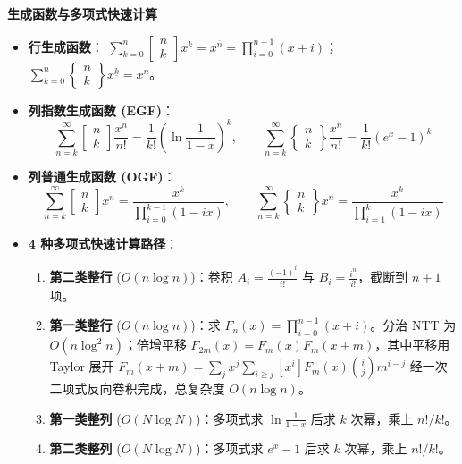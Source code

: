 \textbf{生成函数与多项式快速计算}
\begin{itemize}
    \item \textbf{行生成函数}：
    $\sum_{k=0}^n \left[ \begin{matrix} n \\ k \end{matrix} \right] x^k = x^{\overline{n}} = \prod_{i=0}^{n-1} (x+i)$；
    $\sum_{k=0}^n \left\{ \begin{matrix} n \\ k \end{matrix} \right\} x^{\underline{k}} = x^n$。
    \item \textbf{列指数生成函数 (EGF)}：
    \[
    \sum_{n=k}^\infty \left[ \begin{matrix} n \\ k \end{matrix} \right] \frac{x^n}{n!} = \frac{1}{k!} \left( \ln \frac{1}{1-x} \right)^k, \qquad
    \sum_{n=k}^\infty \left\{ \begin{matrix} n \\ k \end{matrix} \right\} \frac{x^n}{n!} = \frac{1}{k!} (e^x - 1)^k
    \]
    \item \textbf{列普通生成函数 (OGF)}：
    \[
    \sum_{n=k}^\infty \left[ \begin{matrix} n \\ k \end{matrix} \right] x^n = \frac{x^k}{\prod_{i=0}^{k-1} (1 - ix)}, \qquad
    \sum_{n=k}^\infty \left\{ \begin{matrix} n \\ k \end{matrix} \right\} x^n = \frac{x^k}{\prod_{i=1}^k (1 - ix)}
    \]
    \item \textbf{4 种多项式快速计算路径}：
    \begin{enumerate}
        \item \textbf{第二类整行} ($O(n \log n)$)：卷积 $A_i = \frac{(-1)^i}{i!}$ 与 $B_i = \frac{i^n}{i!}$，截断到 $n+1$ 项。
        \item \textbf{第一类整行} ($O(n \log n)$)：求 $F_n(x) = \prod_{i=0}^{n-1} (x+i)$。分治 NTT 为 $O(n \log^2 n)$；倍增平移 $F_{2m}(x) = F_m(x) F_m(x+m)$，其中平移用 Taylor 展开 $F_m(x+m) = \sum_{j} x^j \sum_{i \ge j} [x^i]F_m(x) \binom{i}{j} m^{i-j}$ 经一次二项式反向卷积完成，总复杂度 $O(n \log n)$。
        \item \textbf{第一类整列} ($O(N \log N)$)：多项式求 $\ln \frac{1}{1-x}$ 后求 $k$ 次幂，乘上 $n!/k!$。
        \item \textbf{第二类整列} ($O(N \log N)$)：多项式求 $e^x - 1$ 后求 $k$ 次幂，乘上 $n!/k!$。
    \end{enumerate}
\end{itemize}

